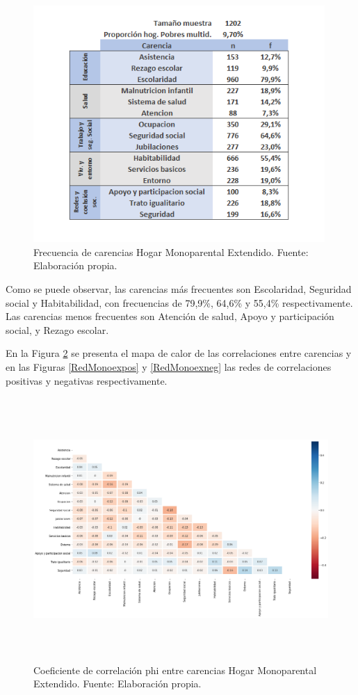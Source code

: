 \documentclass[12pt,letterpaper,spanish]{article}
\begin{document}
\begin{figure}[H]
  \centering
    \includegraphics[height=9cm]{HOGARES/tabla_monoex.png}
    \caption{Frecuencia de carencias Hogar Monoparental Extendido. Fuente: Elaboración propia.}
    \label{freMonoex}
\end{figure}
Como se puede observar, las carencias más frecuentes son Escolaridad, Seguridad social y Habitabilidad, con frecuencias de 79,9\%, 64,6\% y 55,4\% respectivamente. Las carencias menos frecuentes son Atención de salud, Apoyo y participación social, y Rezago escolar.

En la Figura \ref{HMMonoex} se presenta el mapa de calor de las correlaciones entre carencias y en las Figuras \ref{RedMonoexpos} y \ref{RedMonoexneg} las redes de correlaciones positivas y negativas respectivamente.

\begin{figure}[H]
    \centering
    \includegraphics[height=10cm]{Heatmaps/Heatmap_pearson_car_monoex.png}
    \caption{Coeficiente de correlación phi entre carencias Hogar Monoparental Extendido. Fuente: Elaboración propia.}
    \label{HMMonoex}
\end{figure}
\end{document}
